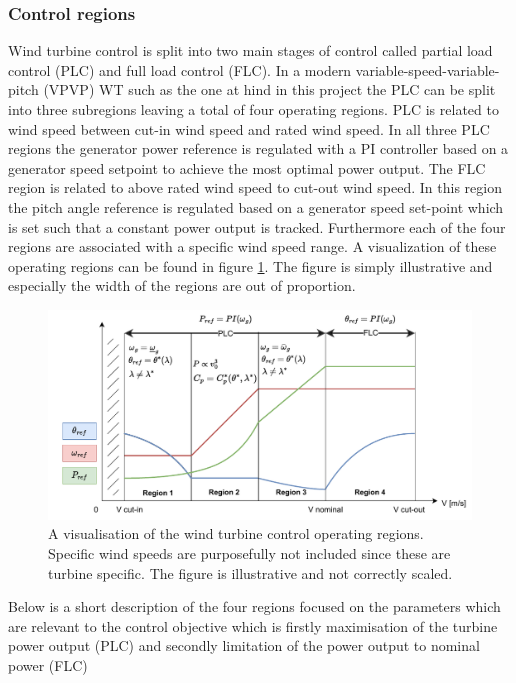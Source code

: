 \subsubsection{Control regions} \label{sec:theyry_ctrl_regions}
Wind turbine control is split into two main stages of control called partial load control (PLC) and full load control (FLC). In a modern variable-speed-variable-pitch (VPVP) WT such as the one at hind in this project the PLC can be split into three subregions leaving a total of four operating regions. PLC is related to wind speed between cut-in wind speed and rated wind speed. In all three PLC regions the generator power reference is regulated with a PI controller based on a generator speed setpoint to achieve the most optimal power output. The FLC region is related to above rated wind speed to cut-out wind speed. In this region the pitch angle reference is regulated based on a generator speed set-point which is set such that a constant power output is tracked. Furthermore each of the four regions are associated with a specific wind speed range. A visualization of these operating regions can be found in figure \cref{fig:operating_regions}. The figure is simply illustrative and especially the width of the regions are out of proportion. 
\begin{figure}[ht]
	\centering
	\includegraphics[width=0.9\linewidth]{Graphics/OperatingRegions.pdf}
	\caption{A visualisation of the wind turbine control operating regions. Specific wind speeds are purposefully not included since these are turbine specific. The figure is illustrative and not correctly scaled.}
	\label{fig:operating_regions}
\end{figure}
Below is a short description of the four regions focused on the parameters which are relevant to the control objective which is firstly maximisation of the turbine power output (PLC) and secondly limitation of the power output to nominal power (FLC)
